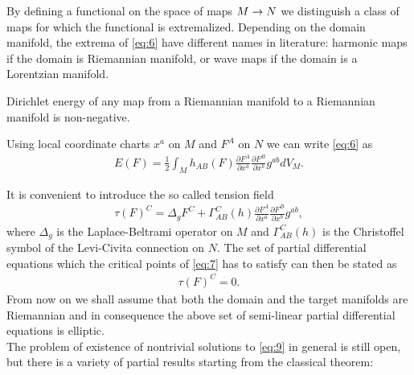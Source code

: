 By defining a functional on the space of maps $M\rightarrow N$ we distinguish
a class of maps for which the functional is extremalized. Depending on
the domain manifold, the extrema of \eqref{eq:6} have different names
in literature: harmonic maps if the domain is Riemannian manifold, or
wave maps if the domain is a Lorentzian manifold.



\begin{remark}
  Dirichlet energy of any map from a Riemannian manifold to a
  Riemannian manifold is non-negative.
\end{remark}

Using local coordinate charts $x^a$ on $M$ and $F^A$ on $N$ we can
write \eqref{eq:6} as
\begin{align}
  \label{eq:7}
  E(F)=\frac{1}{2}\int_M h_{AB}(F)\frac{\partial F^A}{\partial
    x^a}\frac{\partial F^B}{\partial x^b}g^{ab}dV_M.
\end{align}

It is convenient to introduce the so called tension field
\begin{align}
  \label{eq:8}
  \tau(F)^C=\Delta_g F^C+\Gamma_{AB}^{C}(h)\frac{\partial
    F^A}{\partial x^a}\frac{\partial F^B}{\partial x^b}g^{ab},
\end{align}
where $\Delta_g$ is the Laplace-Beltrami operator on $M$ and
$\Gamma_{AB}^{C}(h)$ is the Christoffel symbol of the Levi-Civita
connection on $N$. The set of partial differential equations which the
critical points of \eqref{eq:7} has to satisfy can then be stated as
\begin{align}
  \label{eq:9}
  \tau(F)^C=0.
\end{align}
From now on we shall assume that both the domain and the target
manifolds are Riemannian and in consequence the above
set of semi-linear partial differential equations is elliptic.\\

The problem of existence of nontrivial solutions to \eqref{eq:9} in
general is still open, but there is a variety of partial results
starting from the classical theorem:

